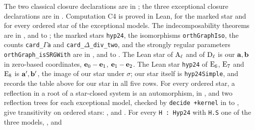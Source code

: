 \begingroup\raggedright
The two classical closure declarations are in ;
the three exceptional closure declarations are in .
Computation C4 is proved in Lean, for the marked star and for every ordered star of the
exceptional models. The indecomposability theorems are in ,
 and  to
; the marked stars \texttt{hyp24}, the isomorphisms
\texttt{orthGraphIso}, the counts \texttt{card\_\ensuremath{\Gamma}a} and \texttt{card\_\ensuremath{\Delta}\_div\_two}, and the
strongly regular parameters \texttt{orthGraph\_isSRGWith} are in
,  and
 to . The Lean star of $\mathrm{A}_\ell$
and of $\mathrm{D}_\ell$ is our ${\mathbf a},{\mathbf b}$ in zero-based coordinates, ${\mathbf e}_0-{\mathbf e}_1$, ${\mathbf e}_1-{\mathbf e}_2$.
The Lean star \texttt{hyp24} of $\mathrm{E}_6$, $\mathrm{E}_7$ and $\mathrm{E}_8$ is ${\mathbf a}',{\mathbf b}'$, the image of
our star under $\sigma$; our star itself is \texttt{hyp24Simple}, and
 records the table above for our star
in all five rows. For every ordered star, a reflection in a root of a star-closed system is an
automorphism,  in
, and two reflection trees for each exceptional model, checked
by \texttt{decide +kernel} in  to
, give transitivity on ordered stars:
,  and
. For every \texttt{H : Hyp24}
with \texttt{H.S} one of the three models, ,
 and
